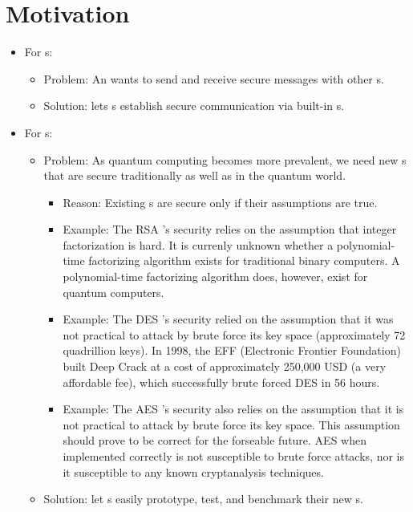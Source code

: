 


\section{Motivation}

\begin{itemize}
\item For \eu s:
  \begin{itemize}
  \item Problem: An \eu{} wants to send and receive
    secure messages with other \eu s.
  \item Solution: \cry{} lets \eu s establish
    secure communication via built-in \cs s.
  \end{itemize}
\item For \cg s:
  \begin{itemize}
  \item Problem: As quantum computing becomes
    more prevalent,
    we need new \cs s that are secure traditionally
    as well as in the quantum world.
    \begin{itemize}
    \item Reason: Existing \cs s are secure
      only if their assumptions are true.
    \item Example: The RSA \cs's security relies on
      the assumption that integer factorization is hard.
      It is currenly unknown whether a polynomial-time
      factorizing algorithm exists for traditional binary
      computers. A polynomial-time factorizing algorithm
      does, however, exist for quantum computers.
    \item Example: The DES \cs's security relied on the
      assumption that it was not practical to attack by
      brute force its key space
      (approximately 72 quadrillion keys). In 1998, the EFF
      (Electronic Frontier Foundation) built Deep Crack
      at a cost of approximately
      250,000 USD (a very affordable fee),
      which successfully brute
      forced DES in 56 hours.
    \item Example: The AES \cs's security also relies on
      the assumption
      that it is not practical to attack by brute force
      its key space.
      This assumption should prove to be correct for
      the forseable future.
      AES when implemented correctly is not susceptible to
      brute force attacks,
      nor is it susceptible to any known cryptanalysis
      techniques.
    \end{itemize}
  \item Solution: \cry{} let \cg s easily prototype, test,
    and benchmark their new \cs s.
  \end{itemize}
\end{itemize}

